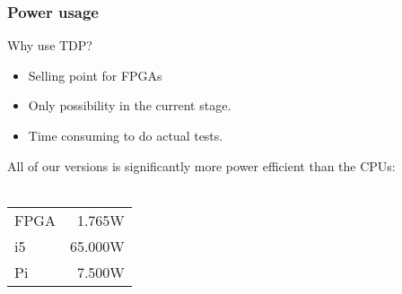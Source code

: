 \begin{frame}
  \frametitle{Power usage}
  Why use TDP?\\
  \begin{itemize}
    \item Selling point for FPGAs
    \item Only possibility in the current stage.
    \item Time consuming to do actual tests.
  \end{itemize}
  All of our versions is significantly more power efficient than the CPUs:\\~\\
  \begin{tabular}{l r}
    FPGA & 1.765W\\
    i5 & 65.000W\\
    Pi & 7.500W
  \end{tabular}
\end{frame}
